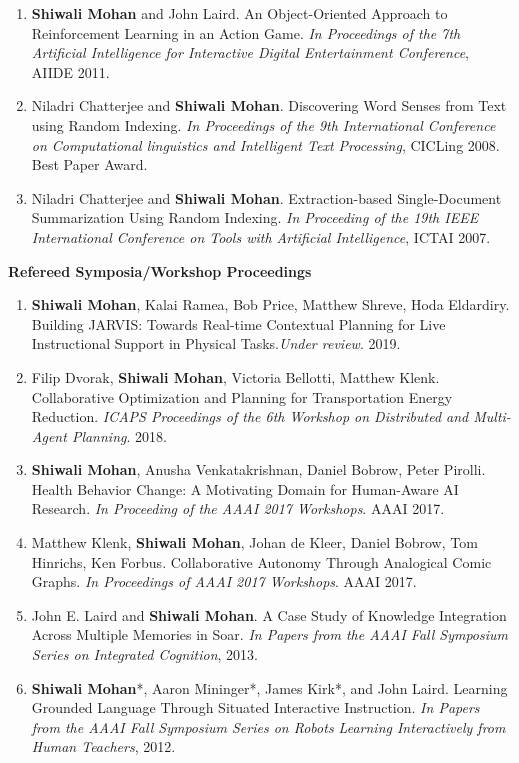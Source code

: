\documentclass[margin,line,11pt]{res}
\begin{document}
\begin{resume}
\begin{enumerate}[label=\lbrack C\arabic*\rbrack,leftmargin=*]
  \item \textbf{Shiwali Mohan} and John Laird. An Object-Oriented Approach to Reinforcement Learning in an Action Game. \emph{In Proceedings of the 7th Artificial Intelligence for Interactive Digital Entertainment Conference}, AIIDE 2011.
  \item Niladri Chatterjee and \textbf{Shiwali Mohan}. Discovering Word Senses from Text using Random Indexing. \emph{In Proceedings of the 9th International Conference on Computational linguistics and Intelligent Text Processing}, CICLing 2008. Best Paper Award.
  \item Niladri Chatterjee and \textbf{Shiwali Mohan}. Extraction-based Single-Document Summarization Using Random Indexing. \emph{In Proceeding of the 19th IEEE International Conference on Tools with Artificial Intelligence}, ICTAI 2007.
\end{enumerate}

\textbf{Refereed Symposia/Workshop Proceedings}
\begin{enumerate}[label=\lbrack W\arabic*\rbrack:,leftmargin=*]
\item \textbf{Shiwali Mohan}, Kalai Ramea, Bob Price, Matthew Shreve, Hoda Eldardiry. Building \textsc{JARVIS}: Towards Real-time Contextual Planning for Live Instructional Support in Physical Tasks.\emph{Under review}. 2019.
\item Filip Dvorak, \textbf{Shiwali Mohan}, Victoria Bellotti, Matthew Klenk. Collaborative Optimization and Planning for Transportation Energy Reduction. \emph{ICAPS Proceedings of the 6th Workshop on Distributed and Multi-Agent Planning}. 2018.
\item \textbf{Shiwali Mohan}, Anusha Venkatakrishnan, Daniel Bobrow, Peter Pirolli. Health Behavior Change: A Motivating Domain for Human-Aware AI Research. \emph{In Proceeding of the AAAI 2017 Workshops}. AAAI 2017.
  
\item Matthew Klenk, \textbf{Shiwali Mohan}, Johan de Kleer, Daniel Bobrow, Tom Hinrichs, Ken Forbus. Collaborative Autonomy Through Analogical Comic Graphs. \emph{In Proceedings of AAAI 2017 Workshops}. AAAI 2017.
  
\item John E. Laird and \textbf{Shiwali Mohan}. A Case Study of Knowledge Integration Across Multiple Memories in Soar. \emph{In Papers from the AAAI Fall Symposium Series on Integrated Cognition}, 2013.
  
\item \textbf{Shiwali Mohan}*, Aaron Mininger*, James Kirk*, and John Laird. Learning Grounded Language Through Situated Interactive Instruction. \emph{In Papers from the AAAI Fall Symposium Series on Robots Learning Interactively from Human Teachers}, 2012.


\end{enumerate}
\end{resume}
\end{document}
